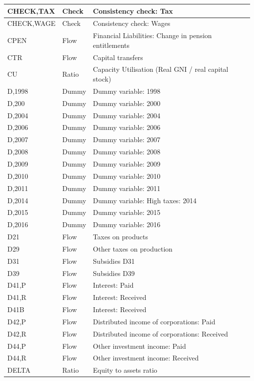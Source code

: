 \documentclass[
]{book}
\begin{document}
\begin{tabular}[t]{l|l|l}
\hline
CHECK,TAX & Check & Consistency check: Tax\\
\hline
CHECK,WAGE & Check & Consistency check: Wages\\
\hline
CPEN & Flow & Financial Liabilities: Change in pension entitlements\\
\hline
CTR & Flow & Capital transfers\\
\hline
CU & Ratio & Capacity Utilisation (Real GNI  /  real capital stock)\\
\hline
D,1998 & Dummy & Dummy variable: 1998\\
\hline
D,200 & Dummy & Dummy variable: 2000\\
\hline
D,2004 & Dummy & Dummy variable: 2004\\
\hline
D,2006 & Dummy & Dummy variable: 2006\\
\hline
D,2007 & Dummy & Dummy variable: 2007\\
\hline
D,2008 & Dummy & Dummy variable: 2008\\
\hline
D,2009 & Dummy & Dummy variable: 2009\\
\hline
D,2010 & Dummy & Dummy variable: 2010\\
\hline
D,2011 & Dummy & Dummy variable: 2011\\
\hline
D,2014 & Dummy & Dummy variable: High taxes: 2014\\
\hline
D,2015 & Dummy & Dummy variable: 2015\\
\hline
D,2016 & Dummy & Dummy variable: 2016\\
\hline
D21 & Flow & Taxes on products\\
\hline
D29 & Flow & Other taxes on production\\
\hline
D31 & Flow & Subsidies D31\\
\hline
D39 & Flow & Subsidies D39\\
\hline
D41,P & Flow & Interest: Paid\\
\hline
D41,R & Flow & Interest: Received\\
\hline
D41B & Flow & Interest: Received\\
\hline
D42,P & Flow & Distributed income of corporations: Paid\\
\hline
D42,R & Flow & Distributed income of corporations: Received\\
\hline
D44,P & Flow & Other investment income: Paid\\
\hline
D44,R & Flow & Other investment income: Received\\
\hline
DELTA & Ratio & Equity to assets ratio\\

\end{tabular}
\end{document}
